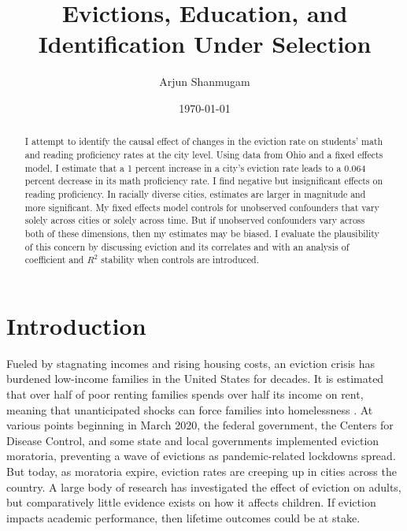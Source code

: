 \documentclass[12pt]{article}
\begin{document}
\begin{titlepage}
\title{Evictions, Education, and Identification Under Selection}
\author{Arjun Shanmugam}
\date{\today}
\maketitle
\begin{abstract}
\noindent I attempt to identify the causal effect of changes in the eviction rate on students' math and reading proficiency rates at the city level. Using data from Ohio and a fixed effects model, I estimate that a 1 percent increase in a city's eviction rate leads to a 0.064 percent decrease in its math proficiency rate. I find negative but insignificant effects on reading proficiency. In racially diverse cities, estimates are larger in magnitude and more significant. My fixed effects model controls for unobserved confounders that vary solely across cities or solely across time. But if unobserved confounders vary across both of these dimensions, then my estimates may be biased. I evaluate the plausibility of this concern by discussing eviction and its correlates and with an analysis of coefficient and $R^2$ stability when controls are introduced.\\

\bigskip
\end{abstract}
\setcounter{page}{0}
\thispagestyle{empty}
\end{titlepage}
\pagebreak \newpage




\doublespacing


\section{Introduction} \label{sec:introduction}
Fueled by stagnating incomes and rising housing costs, an eviction crisis has burdened low-income families in the United States for decades. It is estimated that over half of poor renting families spends over half its income on rent, meaning that unanticipated shocks can force families into homelessness \citep{desmond_evicted:_2017}. At various points beginning in March 2020, the federal government, the Centers for Disease Control, and some state and local governments implemented eviction moratoria, preventing a wave of evictions as pandemic-related lockdowns spread\citep{thrush_federal_2021, goldstein_landlords_2020}. But today, as moratoria expire, eviction rates are creeping up in cities across the country\citep{zaveri_after_2022}. A large body of research has investigated the effect of eviction on adults, but comparatively little evidence exists on how it affects children. If eviction impacts academic performance, then lifetime outcomes could be at stake.
\end{document}
